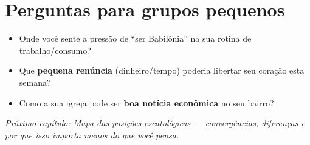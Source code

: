 \section{Perguntas para grupos pequenos}
\begin{itemize}[leftmargin=*,noitemsep]
  \item Onde você sente a pressão de “ser Babilônia” na sua rotina de trabalho/consumo?
  \item Que \textbf{pequena renúncia} (dinheiro/tempo) poderia libertar seu coração esta semana?
  \item Como a sua igreja pode ser \textbf{boa notícia econômica} no seu bairro?
\end{itemize}

\bigskip
\noindent\textit{Próximo capítulo: Mapa das posições escatológicas — convergências, diferenças e por que isso importa menos do que você pensa.}
